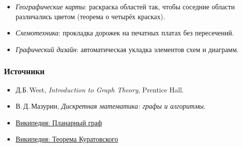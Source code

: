 \begin{itemize}[leftmargin=*]
  \item \emph{Географические карты}: раскраска областей так, чтобы соседние области различались цветом (теорема о четырёх красках).
  \item \emph{Схемотехника}: прокладка дорожек на печатных платах без пересечений.
  \item \emph{Графический дизайн}: автоматическая укладка элементов схем и диаграмм.
\end{itemize}

\subsubsection{Источники}

\begin{itemize}
  \item Д.Б.\,West, \emph{Introduction to Graph Theory}, Prentice Hall.
  \item В.\,Д.\,Мазурин, \emph{Дискретная математика: графы и алгоритмы}.
  \item \href{https://ru.wikipedia.org/wiki/Планарный_граф}{Википедия: Планарный граф}
  \item \href{https://ru.wikipedia.org/wiki/Теорема_Куратовского}{Википедия: Теорема Куратовского}
\end{itemize}
